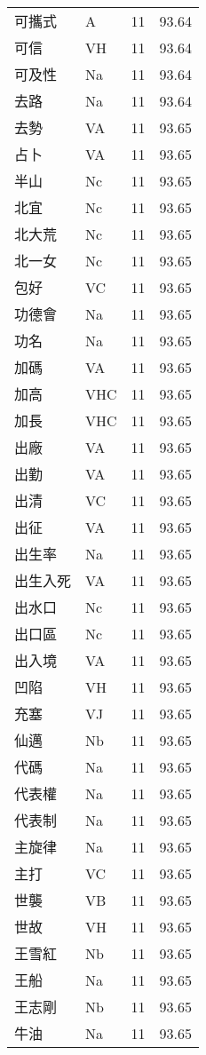 \documentclass[twocolumn]{book}
\begin{document}
\begin{supertabular}{llrr}
可攜式 & A & 11 &  93.64\\
可信 & VH & 11 &  93.64\\
可及性 & Na & 11 &  93.64\\
去路 & Na & 11 &  93.64\\
去勢 & VA & 11 &  93.65\\
占卜 & VA & 11 &  93.65\\
半山 & Nc & 11 &  93.65\\
北宜 & Nc & 11 &  93.65\\
北大荒 & Nc & 11 &  93.65\\
北一女 & Nc & 11 &  93.65\\
包好 & VC & 11 &  93.65\\
功德會 & Na & 11 &  93.65\\
功名 & Na & 11 &  93.65\\
加碼 & VA & 11 &  93.65\\
加高 & VHC & 11 &  93.65\\
加長 & VHC & 11 &  93.65\\
出廠 & VA & 11 &  93.65\\
出勤 & VA & 11 &  93.65\\
出清 & VC & 11 &  93.65\\
出征 & VA & 11 &  93.65\\
出生率 & Na & 11 &  93.65\\
出生入死 & VA & 11 &  93.65\\
出水口 & Nc & 11 &  93.65\\
出口區 & Nc & 11 &  93.65\\
出入境 & VA & 11 &  93.65\\
凹陷 & VH & 11 &  93.65\\
充塞 & VJ & 11 &  93.65\\
仙邁 & Nb & 11 &  93.65\\
代碼 & Na & 11 &  93.65\\
代表權 & Na & 11 &  93.65\\
代表制 & Na & 11 &  93.65\\
主旋律 & Na & 11 &  93.65\\
主打 & VC & 11 &  93.65\\
世襲 & VB & 11 &  93.65\\
世故 & VH & 11 &  93.65\\
王雪紅 & Nb & 11 &  93.65\\
王船 & Na & 11 &  93.65\\
王志剛 & Nb & 11 &  93.65\\
牛油 & Na & 11 &  93.65\\

\end{supertabular}
\end{document}
